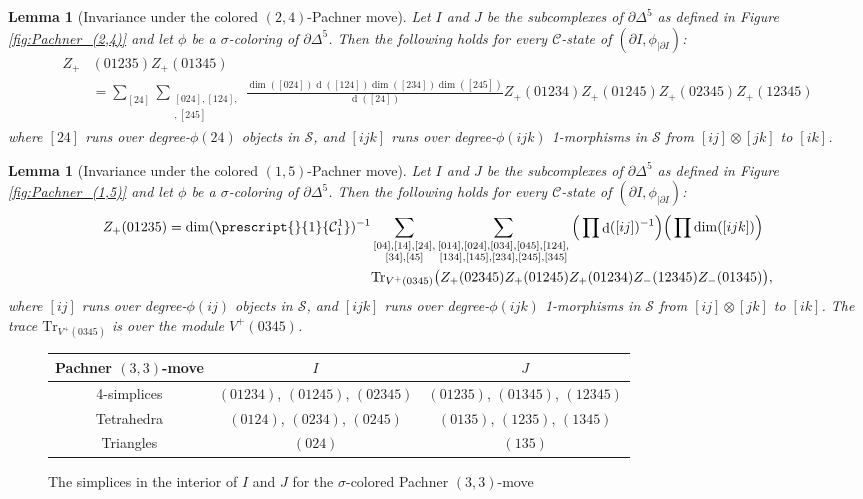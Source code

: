 \documentclass[a4paper, oneside]{amsart}
\DeclareMathOperator{\wdim}{d}
\numberwithin{equation}{subsection}
\theoremstyle{referencedlemma}
\theoremstyle{plain} %
\newtheorem{lem}[equation]{Lemma}
\theoremstyle{remark}
\begin{document}
\begin{lem}[Invariance under the colored $(2,4)$-Pachner move]\label{Lemma_Pachner_(2,4)}
Let $I$ and $J$ be the subcomplexes of $\partial \Delta^5$ as defined in Figure \ref{fig:Pachner_(2,4)} and let $\phi$ be a $\sigma$-coloring of $\partial \Delta^5$. Then the following holds for every $\mathcal{C}$-state of $(\partial I,\phi_{\vert \partial I})$:
\begin{align*}
Z_+&(01235)Z_+(01345) \\
&= \sum_{[24]}\sum_{\substack{[024],  [124], \\ [234], [245]}} \frac{\dim([024])\wdim([124])\dim([234])\dim([245])}{\wdim([24])}Z_+(01234)Z_+(01245)Z_+(02345)Z_+(12345)
\end{align*}
where $[24]$ runs over degree-$\phi(24)$ objects in $\mathcal{S}$,  and $[ijk]$ runs over degree-$\phi(ijk)$ 1-morphisms in $\mathcal{S}$ from $[ij]\otimes [jk]$ to $[ik]$.  
\end{lem}

\begin{lem}[Invariance under the colored $(1,5)$-Pachner move]\label{Lemma_Pachner_(1,5)}
Let $I$ and $J$ be the subcomplexes of $\partial \Delta^5$ as defined in Figure \ref{fig:Pachner_(1,5)} and let $\phi$ be a $\sigma$-coloring of $\partial \Delta^5$. Then the following holds for every $\mathcal{C}$-state of $(\partial I,\phi_{\vert \partial I})$:
\begin{align*}
Z_+(01235) = \dim(\prescript{}{1}{\mathcal{C}^1_1})^{-1}&\sum_{\substack{[04], [14], [24], \\ [34], [45]}} \sum_{\substack{[014], [024], [034], [045],  [124], \\ [134], [145], [234], [245], [345]}} \Big ( \prod\wdim([ij])^{-1}\Big ) \Big ( \prod \dim([ijk])\Big )\\
& \mathrm{Tr}_{V^+(0345)}\big (Z_+(02345)Z_+(01245)Z_+(01234)Z_-(12345)Z_-(01345) \big ),
\end{align*}
where $[ij]$ runs over degree-$\phi(ij)$ objects in $\mathcal{S}$, and $[ijk]$ runs over degree-$\phi(ijk)$ 1-morphisms in $\mathcal{S}$ from $[ij]\otimes [jk]$ to $[ik]$.  The trace $\mathrm{Tr}_{V^+(0345)}$ is over the module $V^+(0345)$. 
\end{lem}

\begin{figure}[h]
\begin{center}
\begin{tabular}{c | c | c}
Pachner $(3,3)$-move& $I$ & $J$ \\
\hline
4-simplices & $(01234)$, $(01245)$, $(02345)$ & $(01235)$, $(01345)$, $(12345)$\\ \hline 
Tetrahedra & $(0124)$, $(0234)$, $(0245)$& $(0135)$, $(1235)$, $(1345)$ \\ \hline
Triangles & $(024)$ &$(135)$ \\
\end{tabular}
\end{center}
\caption{The simplices in the interior of $I$ and $J$ for the $\sigma$-colored Pachner $(3,3)$-move}
\label{fig:Pachner_(3,3)}
\end{figure}
\end{document}
